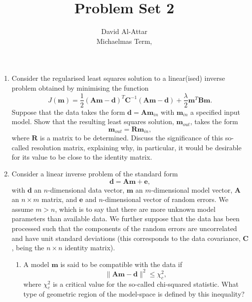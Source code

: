 \documentclass[a4paper,10pt]{paper}
\title{Problem Set 2}
\author{David Al-Attar \\ Michaelmas Term, \the\year}
\begin{document}
\maketitle

\begin{enumerate}

\item Consider the regularised least squares solution to a linear(ised) inverse problem obtained by minimising the function
\begin{equation*}
    J(\mathbf{m})=\frac{1}{2}(\mathbf{A}\mathbf{m}-\mathbf{d})^{T}\mathbf{C}^{-1}(\mathbf{A}\mathbf{m}-\mathbf{d})+\frac{\lambda}{2}\mathbf{m}^{T}\mathbf{B}\mathbf{m}.
\end{equation*}
Suppose that the data takes the form $\mathbf{d}=\mathbf{A}\mathbf{m}_{in}$ with $\mathbf{m}_{in}$ a specified input model. Show that the resulting least squares solution, $\mathbf{m}_{out}$, takes the form
\begin{equation*}
    \mathbf{m}_{out}=\mathbf{R}\mathbf{m}_{in},
\end{equation*}
where $\mathbf{R}$ is a matrix to be determined. Discuss the significance of this so-called resolution matrix, explaining why, in particular, it would be desirable for its value to be close to the identity matrix.

\item

Consider a linear inverse problem of the standard form
\begin{equation*}
    \mathbf{d} = \mathbf{A}\mathbf{m}+\mathbf{e}, 
\end{equation*}
with $\mathbf{d}$ an $n$-dimensional data vector, $\mathbf{m}$ an $m$-dimensional model vector, $\mathbf{A}$ an $n\times m$ matrix, and $\mathbf{e}$ and $n$-dimensional vector of random errors. We assume $m > n$, which 
is to say that there are more unknown model parameters than available data. 
We further suppose  that the data has been processed such that the components of the random errors are uncorrelated and have unit standard deviations (this corresponds to the data covariance, $\mathbf{C}$, being the $n\times n$ identity matrix).



\begin{enumerate}

    \item  A model $\mathbf{m}$ is said to be compatible with the data if
\begin{equation*}
    \|\mathbf{A}\mathbf{m}-\mathbf{d}\|^{2} \le \chi^{2}_{c}, 
\end{equation*}
where $\chi^{2}_{c}$ is a critical value for the so-called chi-squared statistic. What type of geometric region of the model-space is defined by this inequality? 


\end{enumerate}
\end{enumerate}
\end{document}
